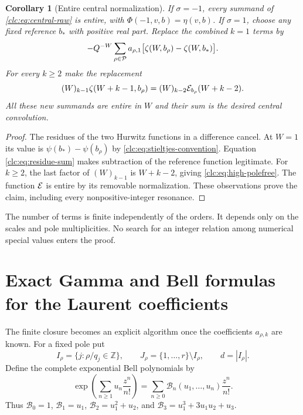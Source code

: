 \documentclass[11pt,a4paper]{article}
\numberwithin{equation}{section}
\newtheorem{corollary}[theorem]{Corollary}
\theoremstyle{definition}\newtheorem{definition}[theorem]{Definition}
\theoremstyle{remark}\newtheorem{remark}[theorem]{Remark}
\begin{document}
\begin{corollary}[Entire central normalization]\label{clc:cor:polefree}
If $\sigma=-1$, every summand of \eqref{clc:eq:central-raw} is entire,
with $\Phi(-1,v,b)=\eta(v,b)$. If $\sigma=1$, choose any fixed reference
$b_*$ with positive real part. Replace the combined $k=1$ terms by
\begin{equation}\label{clc:eq:simple-polefree}
 -Q^{-W}\sum_{\rho\in\mathcal P}a_{\rho,1}
 \bigl[\zeta(W,b_\rho)-\zeta(W,b_*)\bigr].
\end{equation}
For every $k\ge2$ make the replacement
\begin{equation}\label{clc:eq:high-polefree}
 (W)_{k-1}\zeta(W+k-1,b_\rho)
 =(W)_{k-2}\mathcal E_{b_\rho}(W+k-2).
\end{equation}
All these new summands are entire in $W$ and their sum is the desired
central convolution.
\end{corollary}
\begin{proof}
The residues of the two Hurwitz functions in a difference cancel. At
$W=1$ its value is $\psi(b_*)-\psi(b_\rho)$ by
\eqref{clc:eq:stieltjes-convention}. Equation
\eqref{clc:eq:residue-sum} makes subtraction of the reference function
legitimate. For $k\ge2$, the last factor of $(W)_{k-1}$ is
$W+k-2$, giving \eqref{clc:eq:high-polefree}. The function $\mathcal E$ is
entire by its removable normalization. These observations prove the
claim, including every nonpositive-integer resonance.
\end{proof}

The number of terms is finite independently of the orders. It depends
only on the scales and pole multiplicities. No search for an integer
relation among numerical special values enters the proof.

\section{Exact Gamma and Bell formulas for the Laurent coefficients}
\label{clc:sec:coefficients}

The finite closure becomes an explicit algorithm once the coefficients
$a_{\rho,k}$ are known. For a fixed pole put
\[
 I_\rho=\{j:\rho/q_j\in\mathbb Z\},\qquad
 J_\rho=\{1,\ldots,r\}\setminus I_\rho,
 \qquad d=|I_\rho|.
\]
Define the complete exponential Bell polynomials by
\begin{equation}\label{clc:eq:Bell-def}
 \exp\left(\sum_{n\ge1}u_n\frac{z^n}{n!}\right)
 =\sum_{n\ge0}\mathcal B_n(u_1,\ldots,u_n)\frac{z^n}{n!}.
\end{equation}
Thus $\mathcal B_0=1$, $\mathcal B_1=u_1$,
$\mathcal B_2=u_1^2+u_2$, and
$\mathcal B_3=u_1^3+3u_1u_2+u_3$.
\end{document}

